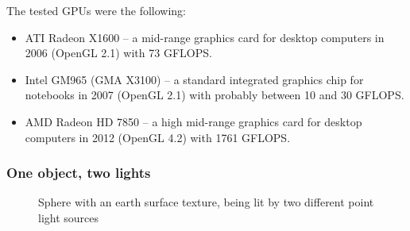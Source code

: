 \documentclass[english,fleqn,10pt,twocolumn]{article}
\begin{document}
The tested GPUs were the following:
\begin{itemize}
    \item ATI Radeon X1600 -- a mid-range graphics card for desktop computers in 2006 (OpenGL 2.1) with 73 GFLOPS.
    \item Intel GM965 (GMA X3100) -- a standard integrated graphics chip for notebooks in 2007 (OpenGL 2.1) with probably between 10 and 30 GFLOPS.
    \item AMD Radeon HD 7850 -- a high mid-range graphics card for desktop computers in 2012 (OpenGL 4.2) with 1761 GFLOPS.
\end{itemize}

\subsubsection{One object, two lights}

\begin{figure}[ht]
    \centering {}
    \caption{Sphere with an earth surface texture, being lit by two different point light sources}
    \label{fig1}
\end{figure}
\end{document}
